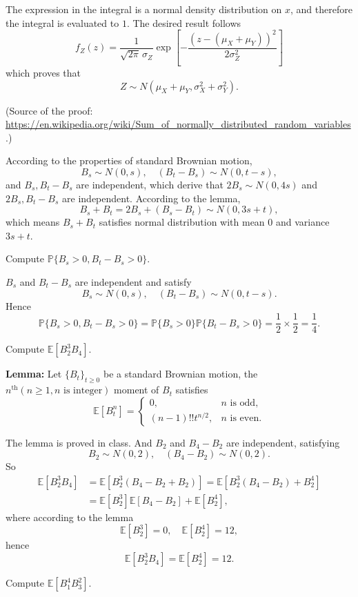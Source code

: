 \documentclass{MFM-hw} %
\newcommand{\EE}{\mathbb{E}}
\newcommand{\PP}{\mathbb{P}}
\begin{document}
The expression in the integral is a normal density distribution on $x$, and therefore the integral
is evaluated to $1$. The desired result follows
\begin{equation*}
f_Z(z) = \frac{1}{\sqrt{2\pi}\,\sigma_Z}
         \exp \left[ -\frac{(z - (\mu_X + \mu_Y))^2}{2\sigma_Z^2} \right]
\end{equation*}
which proves that
\[
Z \sim N(\mu_X+\mu_Y, \sigma^2_X+\sigma^2_Y).
\]

\noindent
(Source of the proof:
\url{https://en.wikipedia.org/wiki/Sum_of_normally_distributed_random_variables}.)

According to the properties of standard Brownian motion, 
\[
B_s \sim N(0,s), \quad (B_t - B_s) \sim N (0, t-s),
\]
and $B_s, B_t - B_s$ are independent, which derive that $2B_s \sim N(0, 4s)$ and $2B_s, B_t - B_s$ are independent. According to the lemma,
\[
B_s + B_t = 2B_s + (B_s - B_t) \sim N(0, 3s + t),
\]
which means $B_s + B_t$ satisfies normal distribution with mean $0$ and variance $3s + t$.

\HWsubproblem
Compute $\PP\{B_s > 0, B_t - B_s > 0\}$.

$B_s$ and $B_t - B_s$ are independent and satisfy
\[
B_s \sim N(0,s), \quad (B_t - B_s) \sim N (0, t-s).
\]
Hence
\[
\PP\{B_s > 0, B_t - B_s > 0\} = \PP\{B_s > 0\}\PP\{B_t - B_s > 0\} = \frac12 \times \frac12 = \frac14.
\]

\HWsubproblem
Compute $\EE[B_2^3B_4]$.

\textbf{Lemma:} Let $\{B_t\}_{t \geq 0}$ be a standard Brownian motion, the $n^{\mathrm{th}}(n \geq 1, n \text{ is integer})$ moment of $B_t$ satisfies
\[
    \EE[B_t^n] = 
    \begin{cases}
    0, & n \text{ is odd,} \\
    (n-1)!! t^{n/2}, & n \text{ is even}.
    \end{cases}
\]

The lemma is proved in class. And $B_2$ and $B_4 - B_2$ are independent, satisfying
\[
B_2 \sim N(0,2), \quad (B_4 - B_2) \sim N (0, 2).
\]
So
\begin{align*}
    \EE[B_2^3B_4] &= \EE[B_2^3(B_4-B_2+B_2)] = \EE[B_2^3(B_4-B_2) + B_2^4] \\
                  &= \EE[B_2^3] \EE[B_4-B_2] +\EE[B_2^4],
\end{align*}
where according to the lemma
\[
    \EE[B_2^3]=0, \quad \EE[B_2^4] = 12,
\]
hence
\[
    \EE[B_2^3B_4] = \EE[B_2^4] = 12.
\]

\HWsubproblem
Compute $\EE[B_1^4B_3^2]$.
\end{document}

